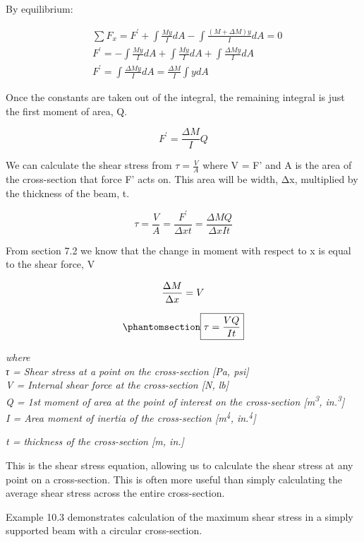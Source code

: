 \documentclass[
  letterpaper,
  DIV=11,
  numbers=noendperiod]{scrreprt}
\theoremstyle{definition}
\theoremstyle{remark}
\begin{document}
By equilibrium:

\[
\begin{aligned}
& \sum F_x=F^{\prime}+\int \frac{M y}{I} d A-\int \frac{(M+\Delta M) y}{I} d A=0 \\
& F^{\prime}=-\int \frac{M y}{I} d A+\int \frac{M y}{I} d A+\int \frac{\Delta M y}{I} d A \\
& F^{\prime}=\int \frac{\Delta M y}{I} d A=\frac{\Delta M}{I} \int y d A
\end{aligned}
\]

Once the constants are taken out of the integral, the remaining integral
is just the first moment of area, Q.

\[
F^{\prime}=\frac{\Delta M}{I} Q
\]

We can calculate the shear stress from \(\tau=\frac{V}{A}\) where V = F'
and A is the area of the cross-section that force F' acts on. This area
will be width, Δx, multiplied by the thickness of the beam, t.

\[
\tau=\frac{V}{A}=\frac{F^{\prime}}{\Delta x t}=\frac{\Delta M Q}{\Delta x I t}
\]

From section 7.2 we know that the change in moment with respect to x is
equal to the shear force, V

\[
\frac{\Delta M}{\Delta x}=V \\
\]

\begin{equation}\phantomsection\label{eq-10.2}{
\boxed{\tau=\frac{VQ}{It}}
}\end{equation}

\emph{where}\\
\emph{τ = Shear stress at a point on the cross-section {[}Pa, psi{]}}\\
\emph{V = Internal shear force at the cross-section {[}N, lb{]}}\\
\emph{Q = 1st moment of area at the point of interest on the
cross-section {[}m\textsuperscript{3}, in.\textsuperscript{3}{]}}\\
\emph{I = Area moment of inertia of the cross-section
{[}m\textsuperscript{4}, in.\textsuperscript{4}{]}}

\emph{t = thickness of the cross-section {[}m, in.{]}}

This is the shear stress equation, allowing us to calculate the shear
stress at any point on a cross-section. This is often more useful than
simply calculating the average shear stress across the entire
cross-section.

Example 10.3 demonstrates calculation of the maximum shear stress in a
simply supported beam with a circular cross-section.
\end{document}
